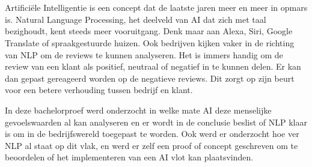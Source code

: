 
%



\chapter*{}

Artificiële Intelligentie is een concept dat de laatste jaren meer en meer in opmars is. Natural Language Processing, het deelveld van AI dat zich met taal bezighoudt, kent steeds meer vooruitgang. Denk maar aan Alexa, Siri, Google Translate of spraakgestuurde huizen. Ook bedrijven kijken vaker in de richting van NLP om de reviews te kunnen analyseren. Het is immers handig om de review van een klant als positief, neutraal of negatief in te kunnen delen. Er kan dan gepast gereageerd worden op de negatieve reviews. Dit zorgt op zijn beurt voor een betere verhouding tussen bedrijf en klant.

In deze bachelorproef werd onderzocht in welke mate AI deze menselijke gevoelswaarden al kan analyseren en er wordt in de conclusie beslist of NLP klaar is om in de bedrijfswereld toegepast te worden. Ook werd er onderzocht hoe ver NLP al staat op dit vlak, en werd er zelf een proof of concept geschreven om te beoordelen of het implementeren van een AI vlot kan plaatsvinden. 

